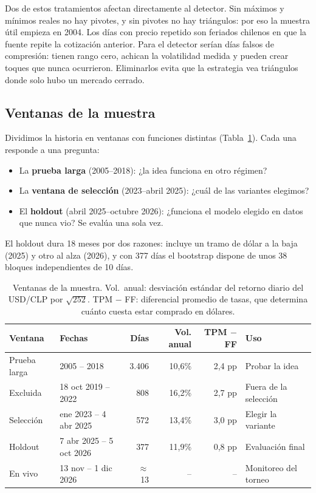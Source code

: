 \documentclass[10pt,a4paper]{article}
\begin{document}
Dos de estos tratamientos afectan directamente al detector. Sin máximos y mínimos
reales no hay pivotes, y sin pivotes no hay triángulos: por eso la muestra útil empieza
en 2004. Los días con precio repetido son feriados chilenos en que la fuente repite la
cotización anterior. Para el detector serían días falsos de compresión: tienen rango
cero, achican la volatilidad medida y pueden crear toques que nunca ocurrieron.
Eliminarlos evita que la estrategia vea triángulos donde solo hubo un mercado cerrado.

\subsection{Ventanas de la muestra}\label{sec:ventanas}

Dividimos la historia en ventanas con funciones distintas (Tabla~\ref{tab:ventanas}).
Cada una responde a una pregunta:
\begin{itemize}
  \item La \textbf{prueba larga} (2005--2018): ¿la idea funciona en otro régimen?
  \item La \textbf{ventana de selección} (2023--abril 2025): ¿cuál de las variantes
        elegimos?
  \item El \textbf{holdout} (abril 2025--octubre 2026): ¿funciona el modelo elegido en
        datos que nunca vio? Se evalúa una sola vez.
\end{itemize}
El holdout dura 18 meses por dos razones: incluye un tramo de dólar a la baja (2025) y
otro al alza (2026), y con 377 días el bootstrap dispone de unos 38 bloques
independientes de 10 días.

\begin{table}[htb]\centering\small
\begin{tabular}{@{}llrrrl@{}}
\toprule
Ventana & Fechas & Días & Vol. anual & TPM $-$ FF & Uso \\
\midrule
Prueba larga  & 2005 -- 2018             & 3.406 & 10,6\% & 2,4 pp & Probar la idea \\
Excluida      & 18 oct 2019 -- 2022      & 808   & 16,2\% & 2,7 pp & Fuera de la selección \\
Selección     & ene 2023 -- 4 abr 2025   & 572   & 13,4\% & 3,0 pp & Elegir la variante \\
Holdout       & 7 abr 2025 -- 5 oct 2026 & 377   & 11,9\% & 0,8 pp & Evaluación final \\
En vivo       & 13 nov -- 1 dic 2026     & $\approx$13 & -- & -- & Monitoreo del torneo \\
\bottomrule
\end{tabular}
\caption{Ventanas de la muestra. Vol.\ anual: desviación estándar del retorno diario
del USD/CLP por $\sqrt{252}$. TPM $-$ FF: diferencial promedio de tasas, que determina
cuánto cuesta estar comprado en dólares.}\label{tab:ventanas}
\end{table}
\end{document}
